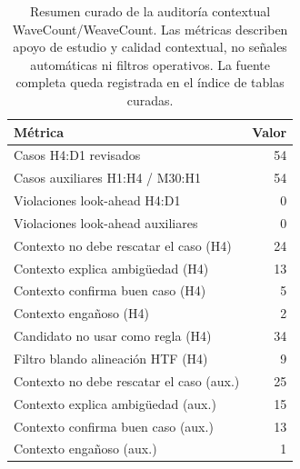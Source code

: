 \begin{table}[H]
\centering
\scriptsize
\begin{tabular}{lr}
\hline
M\'etrica & Valor \\
\hline
Casos H4:D1 revisados & 54 \\
Casos auxiliares H1:H4 / M30:H1 & 54 \\
Violaciones look-ahead H4:D1 & 0 \\
Violaciones look-ahead auxiliares & 0 \\
Contexto no debe rescatar el caso (H4) & 24 \\
Contexto explica ambig\"uedad (H4) & 13 \\
Contexto confirma buen caso (H4) & 5 \\
Contexto enga\~noso (H4) & 2 \\
Candidato no usar como regla (H4) & 34 \\
Filtro blando alineaci\'on HTF (H4) & 9 \\
Contexto no debe rescatar el caso (aux.) & 25 \\
Contexto explica ambig\"uedad (aux.) & 15 \\
Contexto confirma buen caso (aux.) & 13 \\
Contexto enga\~noso (aux.) & 1 \\
\hline
\end{tabular}
\caption{Resumen curado de la auditor\'ia contextual WaveCount/WeaveCount. Las m\'etricas describen apoyo de estudio y calidad contextual, no se\~nales autom\'aticas ni filtros operativos. La fuente completa queda registrada en el \'indice de tablas curadas.}
\label{tab:wavecount-contexto}
\end{table}
